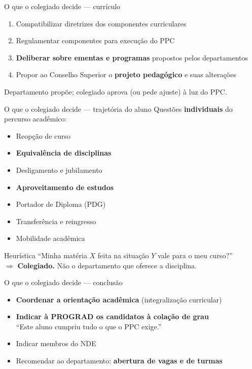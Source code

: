 \documentclass[aspectratio=169]{beamer}
\newcommand{\impt}[1]{\textcolor{maccent}{\textbf{#1}}}
\newcommand{\ntc}[1]{\textcolor{mprimary}{#1}}
\begin{document}
\begin{frame}{O que o colegiado decide --- currículo}
  \begin{enumerate}
    \item Compatibilizar diretrizes dos componentes curriculares
    \item Regulamentar componentes para execução do PPC
    \item \impt{Deliberar sobre ementas e programas} propostos pelos departamentos
    \item Propor ao Conselho Superior o \impt{projeto pedagógico} e suas alterações
  \end{enumerate}

  \vspace{0.4cm}
   
  \ntc{Departamento propõe; colegiado aprova (ou pede ajuste) à luz do PPC.}
\end{frame}

\begin{frame}{O que o colegiado decide --- trajetória do aluno}
  Questões \impt{individuais} do percurso acadêmico:
  \begin{itemize}
    \item Reopção de curso
    \item \impt{Equivalência de disciplinas}
    \item Desligamento e jubilamento
    \item \impt{Aproveitamento de estudos}
    \item Portador de Diploma (PDG)
    \item Transferência e reingresso
    \item Mobilidade acadêmica
  \end{itemize}

  \vspace{0.3cm}
   
  \begin{alertblock}{Heurística}
    ``Minha matéria $X$ feita na situação $Y$ vale para o meu curso?''\\
    $\Rightarrow$ \impt{Colegiado.} Não o departamento que oferece a disciplina.
  \end{alertblock}
\end{frame}

\begin{frame}{O que o colegiado decide --- conclusão}
  \begin{itemize}
    \item \impt{Coordenar a orientação acadêmica} (integralização curricular)
    \item \impt{Indicar à PROGRAD os candidatos à colação de grau}\\
          \ntc{``Este aluno cumpriu tudo o que o PPC exige.''}
    \item Indicar membros do NDE
    \item Recomendar ao departamento: \impt{abertura de vagas e de turmas}
  \end{itemize}
\end{frame}
\end{document}
